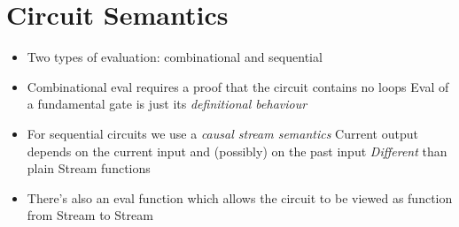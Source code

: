     \section{Circuit Semantics}
    \label{sec:eval-seq}
        \begin{itemize}
            \item Two types of evaluation: combinational and sequential
            \item Combinational eval requires a proof that the circuit contains no loops
                \subitem Eval of a fundamental gate is just its \emph{definitional behaviour}

            \item For sequential circuits we use a \emph{causal stream semantics}
                \subitem Current output depends on the current input and (possibly) on the past input
                \subitem \emph{Different} than plain Stream functions

            \item There's also an eval function which allows the circuit to be viewed as function from Stream to Stream
        \end{itemize}
